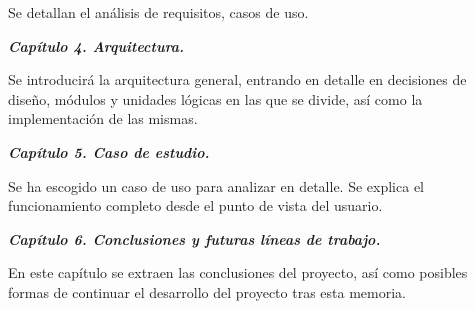 Se detallan el análisis de requisitos, casos de uso.

\textbf{\textit{Capítulo 4. Arquitectura.}}

Se introducirá la arquitectura general, entrando en detalle en decisiones de diseño, módulos y unidades lógicas en las que se divide, así como la  implementación de las mismas.

\textbf{\textit{Capítulo 5. Caso de estudio.}}

Se ha escogido un caso de uso para analizar en detalle. Se explica el funcionamiento completo desde el punto de vista del usuario.

\textbf{\textit{Capítulo 6. Conclusiones y futuras líneas de trabajo.}}

En este capítulo se extraen las conclusiones del proyecto, así como posibles formas de continuar el desarrollo del proyecto tras esta memoria.
